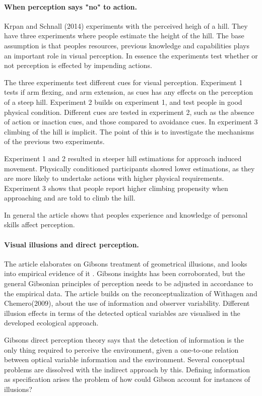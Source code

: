 \documentclass[12pt, a4paper]{article}
\begin{document}
\paragraph{When perception says "no" to action.}
Krpan and Schnall (2014)\cite{noaction} experiments with the perceived heigh of a hill. They
have three experiments where people estimate the height of the hill. The base
assumption is that peoples resources, previous knowledge and capabilities plays
an important role in visual perception. In essence the experiments test whether
or not perception is effected by impending actions. 

The three experiments test different cues for visual perception. Experiment 1
tests if arm flexing, and arm extension, as cues has any effects on the perception
of a steep hill. Experiment 2 builds on experiment 1, and test people in good
physical condition. Different cues are tested in experiment 2, such as the
absence of action or inaction cues, and those compared to avoidance cues.
In experiment 3 climbing of the hill is implicit. The point of this is to
investigate the mechanisms of the previous two experiments. 

Experiment 1 and 2 resulted in steeper hill estimations for approach induced
movement. Physically conditioned participants showed lower estimations, as they
are more likely to undertake actions with higher physical requirements. 
Experiment 3 shows that people report higher climbing propensity when
approaching and are told to climb the hill.  

In general the article shows that peoples experience and knowledge of personal
skills affect perception. 

\paragraph{Visual illusions and direct perception.}
The article elaborates on Gibsons treatment of geometrical illusions, and looks
into empirical evidence of it \cite{visualillusion}. Gibsons insights has been
corroborated, but the general Gibsonian principles of perception needs to be
adjusted in accordance to the empirical data. The article builds on the
reconceptualization of Withagen and Chemero(2009)\cite{visualillusion}, about
the use of information and observer variability. Different illusion effects in
terms of the detected optical variables are visualised in the developed
ecological approach. 

Gibsons direct perception theory says that the detection of information is the
only thing required to perceive the environment, given a one-to-one relation
between optical variable information and the environment. Several conceptual
problems are dissolved with the indirect approach by this. Defining information
as specification arises the problem of how could Gibson account for instances
of illusions?
\end{document}

